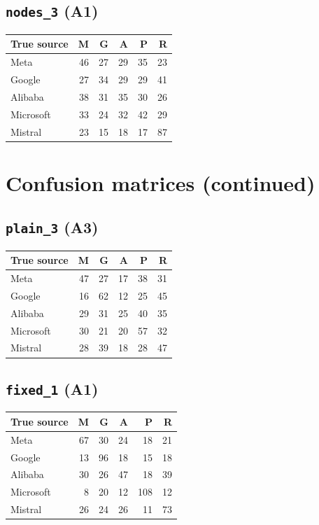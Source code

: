 \documentclass[11pt]{article}
\begin{document}
\subsection*{\texttt{nodes\_3} (A1)}
\begin{center}
\small
\begin{tabular}{lrrrrr}
\toprule
True source & M & G & A & P & R \\
\midrule
Meta & 46 & 27 & 29 & 35 & 23 \\
Google & 27 & 34 & 29 & 29 & 41 \\
Alibaba & 38 & 31 & 35 & 30 & 26 \\
Microsoft & 33 & 24 & 32 & 42 & 29 \\
Mistral & 23 & 15 & 18 & 17 & 87 \\
\bottomrule
\end{tabular}
\end{center}
\clearpage
\section*{Confusion matrices (continued)}
\subsection*{\texttt{plain\_3} (A3)}
\begin{center}
\small
\begin{tabular}{lrrrrr}
\toprule
True source & M & G & A & P & R \\
\midrule
Meta & 47 & 27 & 17 & 38 & 31 \\
Google & 16 & 62 & 12 & 25 & 45 \\
Alibaba & 29 & 31 & 25 & 40 & 35 \\
Microsoft & 30 & 21 & 20 & 57 & 32 \\
Mistral & 28 & 39 & 18 & 28 & 47 \\
\bottomrule
\end{tabular}
\end{center}
\subsection*{\texttt{fixed\_1} (A1)}
\begin{center}
\small
\begin{tabular}{lrrrrr}
\toprule
True source & M & G & A & P & R \\
\midrule
Meta & 67 & 30 & 24 & 18 & 21 \\
Google & 13 & 96 & 18 & 15 & 18 \\
Alibaba & 30 & 26 & 47 & 18 & 39 \\
Microsoft & 8 & 20 & 12 & 108 & 12 \\
Mistral & 26 & 24 & 26 & 11 & 73 \\
\bottomrule
\end{tabular}
\end{center}
\end{document}
